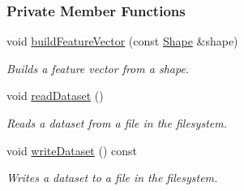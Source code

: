\subsubsection*{Private Member Functions}
\begin{CompactItemize}
\item 
void \hyperlink{class_classifier_6c5a7ef6298b0f0d84873297f1e8c7e9}{buildFeatureVector} (const \hyperlink{class_shape}{Shape} \&shape)
\begin{CompactList}\small\item\em Builds a feature vector from a shape. \item\end{CompactList}\item 
void \hyperlink{class_classifier_8bbab7df78bc986a303fd72a6a472519}{readDataset} ()
\begin{CompactList}\small\item\em Reads a dataset from a file in the filesystem. \item\end{CompactList}\item 
void \hyperlink{class_classifier_dcb995d9926d36b71bb8e723422d4974}{writeDataset} () const 
\begin{CompactList}\small\item\em Writes a dataset to a file in the filesystem. \item\end{CompactList}\end{CompactItemize}
